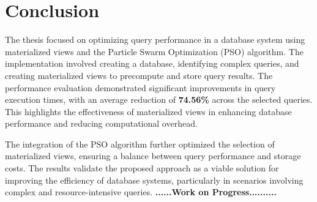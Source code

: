 \section{Conclusion}
The thesis focused on optimizing query performance in a database system using materialized views and the Particle Swarm Optimization (PSO) algorithm. The implementation involved creating a database, identifying complex queries, and creating materialized views to precompute and store query results. The performance evaluation demonstrated significant improvements in query execution times, with an average reduction of \textbf{74.56\%} across the selected queries. This highlights the effectiveness of materialized views in enhancing database performance and reducing computational overhead.

The integration of the PSO algorithm further optimized the selection of materialized views, ensuring a balance between query performance and storage costs. The results validate the proposed approach as a viable solution for improving the efficiency of database systems, particularly in scenarios involving complex and resource-intensive queries.
\textbf{......\textbf{Work on Progress}..........}       